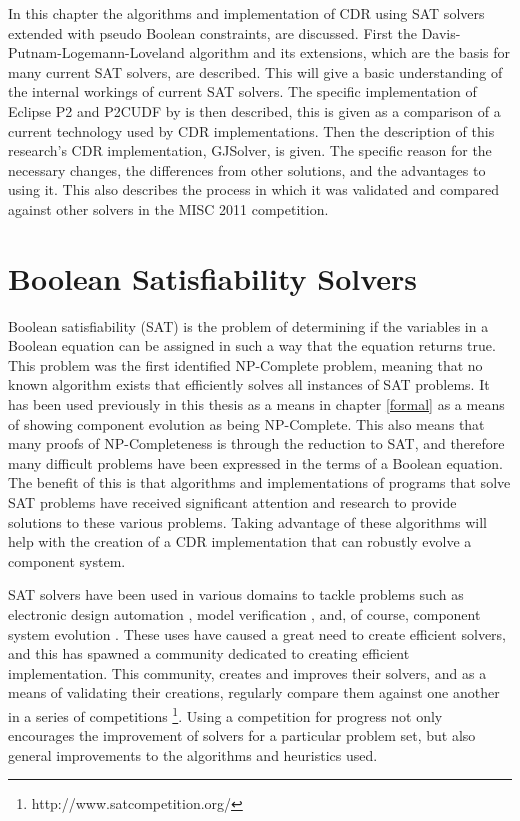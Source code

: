 In this chapter the algorithms and implementation of CDR using SAT solvers extended with pseudo Boolean constraints, are discussed.
First the Davis-Putnam-Logemann-Loveland algorithm \citep{Davis1960, davis1962machine} and its extensions, which are the basis for many current SAT solvers, are described.
This will give a basic understanding of the internal workings of current SAT solvers.
The specific implementation of Eclipse P2 and P2CUDF by \cite{leBerre2010} is then described,
this is given as a comparison of a current technology used by CDR implementations.
Then the description of this research's CDR implementation, GJSolver, is given.
The specific reason for the necessary changes, the differences from other solutions, and the advantages to using it.
This also describes the process in which it was validated and compared against other solvers in the MISC 2011 competition.

\section{Boolean Satisfiability Solvers}
\label{impl.SAT}
Boolean satisfiability (SAT) is the problem of determining if the variables in a Boolean equation can be assigned in such a way that the equation returns true.
This problem was the first identified NP-Complete problem, meaning that no known algorithm exists that efficiently solves all instances of SAT problems.
It has been used previously in this thesis as a means in chapter \ref{formal} as a means of showing component evolution as being NP-Complete.
This also means that many proofs of NP-Completeness is through the reduction to SAT, and therefore many difficult problems have been expressed in the terms of a Boolean equation.
The benefit of this is that algorithms and implementations of programs that solve SAT problems have received significant attention and research to provide solutions to these various problems.
Taking advantage of these algorithms will help with the creation of a CDR implementation that can robustly evolve a component system.

SAT solvers have been used in various domains to tackle problems such as electronic design automation \citep{Marques-Silva2000}, 
model verification \citep{dennis2006}, and, of course, component system evolution \citep{leBerre2010}.
These uses have caused a great need to create efficient solvers, and this has spawned a community dedicated to creating efficient implementation.
This community, creates and improves their solvers, 
and as a means of validating their creations, regularly compare them against one another in a series of competitions \footnote{http://www.satcompetition.org/}.
Using a competition for progress not only encourages the improvement of solvers for a particular problem set, but also general improvements to the algorithms and heuristics used. 

